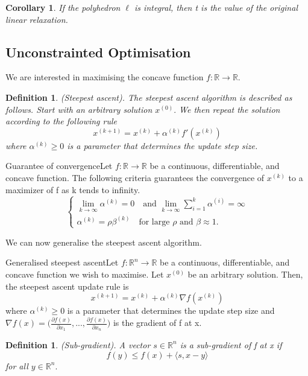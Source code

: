 \documentclass[twoside]{article}
\newtheorem{corollary}[theorem]{Corollary}
\newtheorem{definition}[theorem]{Definition}
\begin{document}
\begin{corollary}If the polyhedron $\ell$ is integral, then t is the value of the original linear relaxation.
\end{corollary}

\subsection{Unconstrainted Optimisation}

We are interested in maximising the concave function $f: \mathbb{R} \rightarrow \mathbb{R}.$
\begin{definition}(Steepest ascent). The steepest ascent algorithm is described as follows. Start with an arbitrary solution $x^{(0)}.$ We then repeat the solution according to the following rule 
$$
x^{(k+1)} = x^{(k)} + \alpha^{(k)}f'(x^{(k)})
$$
where $\alpha^{(k)} \geq 0$ is a parameter that determines the update step size. 
\end{definition}

\begin{theorem_exam}{Guarantee of convergence}{}Let $f: \mathbb{R} \rightarrow \mathbb{R}$ be a continuous, differentiable, and concave function. The following criteria guarantees the convergence of $x^{(k)}$ to a maximizer of f as k tends to infinity.
$$
\begin{cases}
\lim_{k \rightarrow \infty}\alpha^{(k)} = 0 \quad \text{and } \lim_{k \rightarrow \infty}\sum_{i=1}^{k}\alpha^{(i)} = \infty \\
\alpha^{(k)} = \rho\beta^{(k)} \quad \text{for large }\rho \text{ and } \beta \approx 1.
\end{cases}
$$
\end{theorem_exam}

We can now generalise the steepest ascent algorithm.
\begin{theorem_exam}{Generalised steepest ascent}{}Let $f: \mathbb{R}^n \rightarrow \mathbb{R}$ be a continuous, differentiable, and concave function we wish to maximise. Let $x^{(0)}$ be an arbitrary solution. Then, the steepest ascent update rule is 
$$
x^{(k+1)} = x^{(k)} + \alpha^{(k)}\nabla f(x^{(k)})
$$
where $\alpha^{(k)} \geq 0$ is a parameter that determines the update step size and $\nabla f(x) = \bigg(\frac{\partial f(x)}{\partial x_1},...,\frac{\partial f(x)}{\partial x_n} \bigg)$ is the gradient of f at x.
\end{theorem_exam}

\begin{definition}(Sub-gradient). A vector $s \in \mathbb{R}^n$ is a sub-gradient of f at x if 
$$
f(y) \leq f(x) + \langle s, x-y\rangle
$$
for all $y \in \mathbb{R}^n.$
\end{definition}
\end{document}
